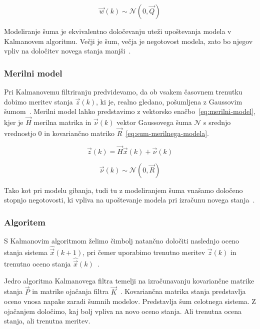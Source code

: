 \begin{equation}
 \vec{w}(k) \sim \mathcal{N}\left(0,\vec{Q}\right)
 \label{eq:sum-modela-gibanja}
\end{equation}

Modeliranje šuma je ekvivalentno določevanju uteži upoštevanja modela v Kalmanovem algoritmu. Večji je šum, večja je negotovost modela, zato bo njegov vpliv na določitev novega stanja manjši~\cite{trucco1998introductory}.


\subsubsection{Merilni model}
Pri Kalmanovemu filtriranju predvidevamo, da ob vsakem časovnem trenutku dobimo meritev stanja $\vec{z}(k)$, ki je, realno gledano, pošumljena z Gaussovim šumom~\cite{trucco1998introductory}. Merilni model lahko predstavimo z vektorsko enačbo~\eqref{eq:merilni-model}, kjer je $\vec{H}$ merilna matrika in $\vec{\nu}(k)$ vektor Gaussovega šuma $\mathcal{N}$ s srednjo vrednostjo $0$ in kovariančno matriko $\vec{R}$~\eqref{eq:sum-merilnega-modela}.


\begin{equation}
 \vec{z}(k) = \vec{H} \vec{x}(k) + \vec{\nu}(k)
 \label{eq:merilni-model}
\end{equation}

\begin{equation}
\vec{\nu}(k) \sim \mathcal{N} \left( 0, \vec{R} \right)
\label{eq:sum-merilnega-modela}
\end{equation}


Tako kot pri modelu gibanja, tudi tu z modeliranjem šuma vnašamo določeno stopnjo negotovosti, ki vpliva na upoštevanje modela pri izračunu novega stanja~\cite{trucco1998introductory}.


\subsubsection{Algoritem}
S Kalmanovim algoritmom želimo čimbolj natančno določiti naslednjo oceno stanja sistema $\hat{\vec{x}}(k+1)$, pri čemer uporabimo trenutno meritev $\vec{z}(k)$ in trenutno oceno stanja $\hat{\vec{x}}(k)$~\cite{trucco1998introductory}. 

Jedro algoritma Kalmanovega filtra temelji na izračunavanju kovariančne matrike stanja $\vec{P}$ in matrike ojačanja filtra $\vec{K}$~\cite{trucco1998introductory}. Kovariančna matrika stanja predstavlja oceno vnosa napake zaradi šumnih modelov. Predstavlja šum celotnega sistema. Z ojačanjem določimo, kaj bolj vpliva na novo oceno stanja. Ali trenutna ocena stanja, ali trenutna meritev.

